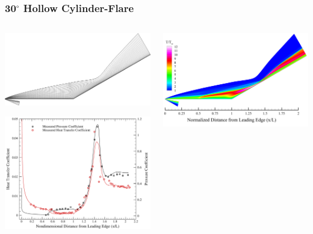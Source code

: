 \documentclass[compress,11pt]{beamer}
\begin{document}
\frame
{
  \frametitle{\scriptsize 30$^\circ$ Hollow Cylinder-Flare}
  \vspace{-2.4em}
  \begin{columns}[t]
      \begin{center}
	\includegraphics[width=\textwidth]{figures/holden_hollow_cylinder/grid} \vspace{.5em}
	
	\includegraphics[width=\textwidth]{figures/holden_hollow_cylinder/ch_cp_comparison}
      \end{center}      
      \begin{center}
	\includegraphics[width=\textwidth]{figures/holden_hollow_cylinder/T}
	

\end{center}
\end{columns}}
\end{document}
